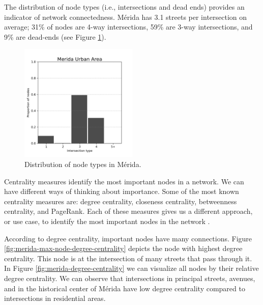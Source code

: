The distribution of node types (i.e., intersections and dead ends) provides an indicator of network connectedness. Mérida has 3.1 streets per intersection on average; 31\% of nodes are 4-way intersections, 59\% are 3-way intersections, and 9\% are dead-ends (see Figure \ref{fig:merida-node-types-distribution}).

\begin{figure}[h!]
	\centering
	\includegraphics[width=0.5\textwidth]{Figures/merida-street-per-node-proportion-distribution.png}
	\caption{Distribution of node types in Mérida.
		\label{fig:merida-node-types-distribution}}
\end{figure}

Centrality measures identify the most important nodes in a network. We can have different ways of thinking about importance. Some of the most known centrality measures are: degree centrality, closeness centrality, betweenness centrality, and PageRank. Each of these measures gives us a different approach, or use case, to identify the most important nodes in the network \cite{menczer_fortunato_davis_2020}.

According to degree centrality, important nodes have many connections. Figure \ref{fig:merida-max-node-degree-centrality} depicts the node with highest degree centrality. This node is at the intersection of many streets that pass through it. In Figure \ref{fig:merida-degree-centrality} we can visualize all nodes by their relative degree centrality. We can observe that intersections in principal streets, avenues, and in the historical center of Mérida have low degree centrality compared to intersections in residential areas.

